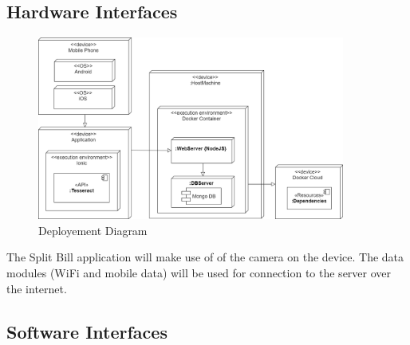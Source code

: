 \documentclass[12pt,a4paper]{article}
\begin{document}
   	\subsection{Hardware Interfaces}
   		\begin{figure}[H]  
		  \includegraphics[width=0.9\textwidth]{diagrams/deployment.png}
		   \vspace{0.1cm}
		    \caption{Deployement Diagram}
		    \label{Deployment Diagram}
		\end{figure}
   		The Split Bill application will make use of of the camera on the device. The data modules (WiFi and mobile data) will be used for connection to the server over the internet.
   	\subsection{Software Interfaces}
		
\end{document}
